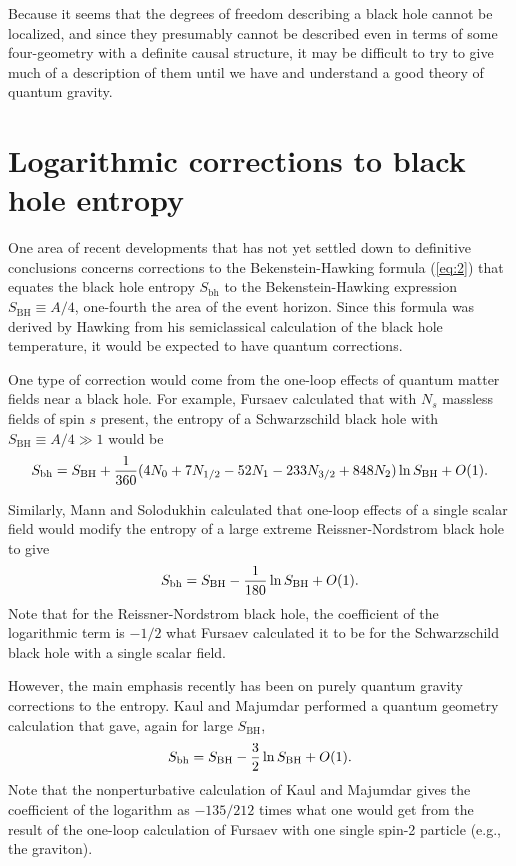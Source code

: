 \documentclass[12pt]{article} \usepackage{latexsym} \textwidth 15cm
\begin{document}
Because it seems that the degrees of freedom describing a black hole
cannot be localized, and since they presumably cannot be described
even in terms of some four-geometry with a definite causal structure,
it may be difficult to try to give much of a description of them until
we have and understand a good theory of quantum gravity.

\section{Logarithmic corrections to black hole entropy}

One area of recent developments that has not yet settled down to
definitive conclusions concerns corrections to the Bekenstein-Hawking
formula (\ref{eq:2}) that equates the black hole entropy
$S_{\mathrm{bh}}$ to the Bekenstein-Hawking expression $S_{\mathrm{BH}}
\equiv A/4$, one-fourth the area of the event horizon.  Since this
formula was derived by Hawking from his semiclassical calculation of
the black hole temperature, it would be expected to have quantum
corrections.

One type of correction would come from the one-loop effects of quantum
matter fields near a black hole.  For example, Fursaev \cite{Fur}
calculated that with $N_s$ massless fields of spin $s$ present, the
entropy of a Schwarzschild black hole with $S_{\mathrm{BH}} \equiv A/4
\gg 1$ would be
 \begin{equation}
 S_{\mathrm{bh}} = S_{\mathrm{BH}} + {1\over 360}(4N_0 + 7N_{1/2} -
 52N_1 - 233N_{3/2} + 848N_2) \ln{S_{\mathrm{BH}}} + O(1).
 \label{eq:20}
 \end{equation}

Similarly, Mann and Solodukhin \cite{ManSol} calculated that one-loop
effects of a single scalar field would modify the entropy of a large
extreme Reissner-Nordstrom black hole to give
 \begin{equation}
 S_{\mathrm{bh}} = S_{\mathrm{BH}} - {1\over 180} \ln{S_{\mathrm{BH}}} +
 O(1).
 \label{eq:21}
 \end{equation}
Note that for the Reissner-Nordstrom black hole, the coefficient of the
logarithmic term is $-1/2$ what Fursaev calculated it to be for the
Schwarzschild black hole with a single scalar field.

However, the main emphasis recently has been on purely quantum gravity
corrections to the entropy.  Kaul and Majumdar \cite{KM} performed a
quantum geometry calculation that gave, again for large
$S_{\mathrm{BH}}$,
 \begin{equation}
 S_{\mathrm{bh}} = S_{\mathrm{BH}} - {3\over 2} \ln{S_{\mathrm{BH}}} +
 O(1).
 \label{eq:22}
 \end{equation}
Note that the nonperturbative calculation of Kaul and Majumdar gives the
coefficient of the logarithm as $-135/212$ times what one would get from
the result of the one-loop calculation of Fursaev with one single spin-2
particle (e.g., the graviton).
\end{document}
